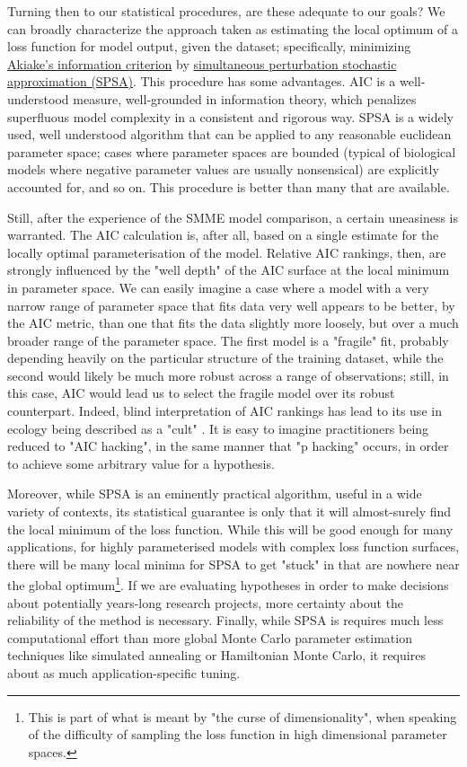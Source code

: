 Turning then to our statistical procedures, are these adequate to our goals? We can broadly characterize the approach taken as estimating the local optimum of a loss function for model output, given the dataset; specifically, minimizing \hyperref[ssec:AIC]{Akiake's information criterion} by \hyperref[ssec:SPSA]{simultaneous perturbation stochastic approximation (SPSA)}. This procedure has some advantages. AIC is a well-understood measure, well-grounded in information theory, which penalizes superfluous model complexity in a consistent and rigorous way. SPSA is a widely used, well understood algorithm that can be applied to any reasonable euclidean parameter space; cases where parameter spaces are bounded (typical of biological models where negative parameter values are usually nonsensical) are explicitly accounted for, and so on. This procedure is better than many that are available.

Still, after the experience of the SMME model comparison, a certain uneasiness is warranted. The AIC calculation is, after all, based on a single estimate for the locally optimal parameterisation of the model. Relative AIC rankings, then, are strongly influenced by the "well depth" of the AIC surface at the local minimum in parameter space. We can easily imagine a case where a model with a very narrow range of parameter space that fits data very well appears to be better, by the AIC metric, than one that fits the data slightly more loosely, but over a much broader range of the parameter space. The first model is a "fragile" fit, probably depending heavily on the particular structure of the training dataset, while the second would likely be much more robust across a range of observations; still, in this case, AIC would lead us to select the fragile model over its robust counterpart. Indeed, blind interpretation of AIC rankings has lead to its use in ecology being described as a "cult" \cite{Brewer2020}. It is easy to imagine practitioners being reduced to "AIC hacking", in the same manner that "p hacking" occurs, in order to achieve some arbitrary value for a hypothesis.

Moreover, while SPSA is an eminently practical algorithm, useful in a wide variety of contexts, its statistical guarantee is only that it will almost-surely find the local minimum of the loss function. While this will be good enough for many applications, for highly parameterised models with complex loss function surfaces, there will be many local minima for SPSA to get "stuck" in that are nowhere near the global optimum\footnote{This is part of what is meant by "the curse of dimensionality", when speaking of the difficulty of sampling the loss function in high dimensional parameter spaces.}. If we are evaluating hypotheses in order to make decisions about potentially years-long research projects, more certainty about the reliability of the method is necessary. Finally, while SPSA is requires much less computational effort than more global Monte Carlo parameter estimation techniques like simulated annealing or Hamiltonian Monte Carlo, it requires about as much application-specific tuning.

